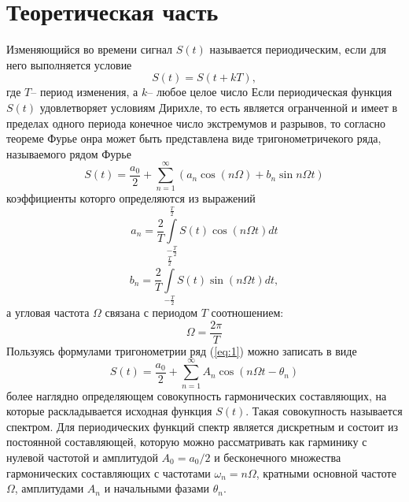 
\usepackage{setspace}



\def\labauthors{Понур К.А., Сарафанов Ф.Г., Сидоров Д.А.}
\def\labgroup{420}
\def\labnumber{3000}
\def\labtheme{aqsdfghjkl;}
\renewcommand{\vec}{\mathbf}
\renewcommand{\Re}{\operatorname{Re}}
\renewcommand{\Im}{\operatorname{Im}}
\renewcommand{\phi}{\varphi}
\renewcommand{\kappa}{\varkappa}
\renewcommand{\hat}{\widehat}

\begin{spacing}{1}
\tableofcontents
\end{spacing}
\newpage
 \section{Теоретическая часть}
 	Изменяющийся во времени сигнал $S(t)$ называется периодическим, если для него выполняется условие
 	\begin{equation}
 		S(t)=S(t+kT),
 	\end{equation}
 	где $T$-- период изменения, а $k$-- любое целое число
Если периодическая функция $S(t)$ удовлетворяет условиям Дирихле, то есть является огранченной и имеет в пределах одного периода конечное число экстремумов и разрывов, то согласно теореме Фурье онра может быть представлена  виде тригонометричекого ряда, называемого рядом Фурье
\begin{equation}
	\label{eq:1}
	S(t)=\frac{a_0}{2}+\sum_{n=1}^\infty(a_n\cos(n\Omega )+b_n\sin{n\Omega t})
\end{equation}
коэффициенты которго определяются из выражений
\begin{equation}
	\label{eq:2.1}
	a_n=\frac{2}{T}\int\limits_{-\frac{T}{2}}^{\frac{T}{2}}S(t)\cos(n\Omega t )dt
\end{equation}
\begin{equation}
	\label{eq:2.2}
	b_n=\frac{2}{T}\int\limits_{-\frac{T}{2}}^{\frac{T}{2}}S(t)\sin(n\Omega t )dt,
\end{equation}
а угловая частота $\Omega$ связана с периодом $T$ соотношением:
\begin{equation}
	\Omega=\frac{2\pi}{T}
\end{equation}
Пользуясь формулами тригонометрии ряд (\ref{eq:1}) можно записать в виде
\begin{equation}
\label{eq:3}
 	S(t)=\frac{a_0}{2}+\sum_{n=1}^{\infty}A_n\cos(n\Omega t-\theta_n)
 \end{equation} 
 более наглядно определяющем совокупность гармонических составляющих, на которые раскладывается исходная функция $S(t)$. Такая совокупность называется спектром. Для периодических функций спектр является дискретным и состоит из постоянной составляющей, которую можно рассматривать как гарминику с нулевой частотой и амплитудой $A_0=a_0/2$ и бесконечного множества гармонических составляющих с частотами $\omega_n=n\Omega$, кратными основной частоте $\Omega$, амплитудами $A_n$ и начальными фазами $\theta_n$.

